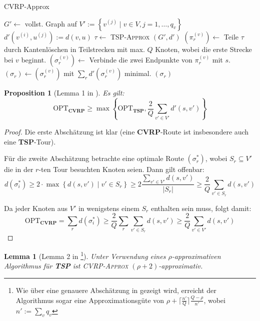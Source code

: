 \documentclass[a4paper,ngerman,12pt,bibtotoc]{scrartcl}
\theoremstyle{definition}
\theoremstyle{plain}
\newtheorem{prop}[defn]{Proposition}
\newtheorem{lemma}[defn]{Lemma}
\theoremstyle{remark}
\newcommand{\RR}{\mathbb{R}}
\newcommand{\OPT}{\mathrm{OPT}}
\newcommand{\TSP}{\textbf{TSP}}
\newcommand{\CVRP}{\textbf{CVRP}}
\begin{document}
	\begin{algorithm}[H]
		\caption{CVRP-Approx}\label{AlgCVRP}
		\begin{algorithmic}[1]
			\Procedure{CVRP}{$G=(V,E)$, $d:E\to \RR_{\geq 0}, Q, (q_v)_{v\in V}$}
			\State $G' \gets$ vollst. Graph auf $V' := \left\lbrace v^{(j)} \mid v \in V, j=1,\dots,q_v\right\rbrace$
			\State $d'(v^{(i)}, u^{(j)}) := d(v,u)$
			\State $\tau \gets$ \textsc{TSP-Approx} $\left(G', d'\right)$
				\State $\left(\pi_r^{(v)}\right) \gets$ Teile $\tau$ durch Kantenlöschen in Teilstrecken mit max. $Q$ Knoten,
				\Statex \hspace{8em} wobei die erste Strecke bei $v$ beginnt.
				\State $\left(\sigma_r^{(v)}\right) \gets$ Verbinde die zwei Endpunkte von $\pi^{(v)}_r$ mit $s$.
			\EndFor
			\State $\left(\sigma_r\right) \gets \left(\sigma_r^{(v)}\right)$ mit $\sum_r d'(\sigma_r^{(v)})$ minimal.
			\State \Return $\left(\sigma_r\right)$
			\EndProcedure
		\end{algorithmic}
	\end{algorithm}	
	
	\begin{prop}[Lemma 1 in \cite{CVRPApprox}]\label{CVRPLowerBound}
		Es gilt: 
			\[\OPT_\CVRP \geq \max\left\lbrace\OPT_\TSP, \frac{2}{Q}\sum_{v'\in V'}d'(s,v')\right\rbrace\]
	\end{prop}
	
	\begin{proof}
		Die erste Abschätzung ist klar (eine \CVRP-Route ist insbesondere auch eine \TSP-Tour).
		
		Für die zweite Abschätzung betrachte eine optimale Route $\left(\sigma_r^\ast\right)$, wobei $S_r \subseteq V'$ die in der $r$-ten Tour besuchten Knoten seien. Dann gilt offenbar:
			\[d\left(\sigma_i^\ast\right) \geq 2\cdot \max\left\lbrace d(s,v') \mid v'\in S_r\right\rbrace \geq 2\frac{\sum_{v'\in V'}d(s,v')}{\left|S_r\right|} \geq \frac{2}{Q}\sum_{v'\in S_r}d(s,v')\]
		
		Da jeder Knoten aus $V'$ in wenigstens einem $S_r$ enthalten sein muss, folgt damit:
			\[\OPT_\CVRP = \sum_r d\left(\sigma_i^\ast\right) \geq \frac{2}{Q}\sum_r\sum_{v'\in S_r}d(s,v') \geq \frac{2}{Q}\sum_{v'\in V'}d(s,v')\]
	\end{proof}
	
	\begin{lemma}[Lemma 2 in \cite{CVRPApprox}\footnote{Wie über eine genauere Abschätzung in \cite{CVRPApprox} gezeigt wird, erreicht der Algorithmus sogar eine Approximationsgüte von $\rho + \lceil\frac{n'}{Q}\rceil \frac{Q-\rho}{n'}$, wobei $n' := \sum_v q_v$}]\label{AlgCVRPProof}
		Unter Verwendung eines $\rho$-approximativen Algorithmus für \TSP{} ist \textsc{CVRP-Approx} $(\rho+2)$-approximativ.
	\end{lemma}	
	
\end{document}
